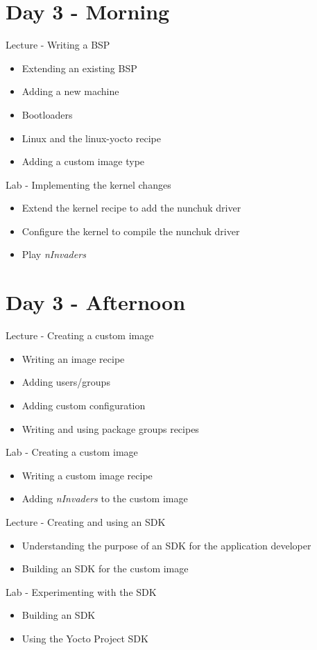 \documentclass[a4paper,12pt,obeyspaces,spaces,hyphens]{article}
\begin{document}
\section{Day 3 - Morning}

\feagendatwocolumn
{Lecture - Writing a BSP}
{
  \begin{itemize}
  \item Extending an existing BSP
  \item Adding a new machine
  \item Bootloaders
  \item Linux and the linux-yocto recipe
  \item Adding a custom image type
  \end{itemize}
}
{Lab - Implementing the kernel changes}
{
  \begin{itemize}
  \item Extend the kernel recipe to add the nunchuk driver
  \item Configure the kernel to compile the nunchuk driver
  \item Play {\em nInvaders}
  \end{itemize}
}

\section{Day 3 - Afternoon}

\feagendatwocolumn
{Lecture - Creating a custom image}
{
  \begin{itemize}
  \item Writing an image recipe
  \item Adding users/groups
  \item Adding custom configuration
  \item Writing and using package groups recipes
  \end{itemize}
}
{Lab - Creating a custom image}
{
  \begin{itemize}
  \item Writing a custom image recipe
  \item Adding {\em nInvaders} to the custom image
  \end{itemize}
}

\feagendatwocolumn
{Lecture - Creating and using an SDK}
{
  \begin{itemize}
  \item Understanding the purpose of an SDK for the application
    developer
  \item Building an SDK for the custom image
  \end{itemize}
}
{Lab - Experimenting with the SDK}
{
  \begin{itemize}
  \item Building an SDK
  \item Using the Yocto Project SDK
  \end{itemize}
}
\end{document}
